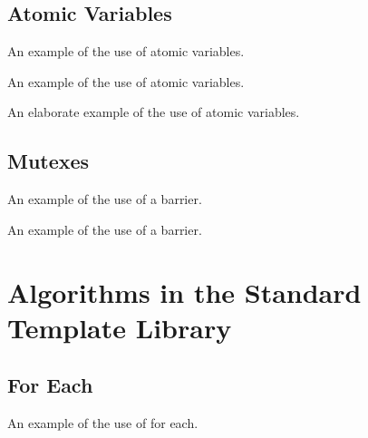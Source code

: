 \begin{itemize}
\begin{end}
\subsection{Atomic Variables}

\raggedbottom
\begin{codebox}[]{\href{https://godbolt.org/z/}{\ExternalLink}}
\footnotesize An example of the use of atomic variables.
\tcblower
{}
\end{codebox}

\raggedbottom
\begin{codebox}[]{\href{https://godbolt.org/z/}{\ExternalLink}}
\footnotesize An example of the use of atomic variables.
\tcblower
{}
\end{codebox}

\raggedbottom
\begin{codebox}[]{\href{https://godbolt.org/z/}{\ExternalLink}}
\footnotesize An elaborate example of the use of atomic variables.
\tcblower
{}
\end{codebox}

\subsection{Mutexes}

\raggedbottom
\begin{codebox}[]{\href{https://godbolt.org/z/}{\ExternalLink}}
\footnotesize An example of the use of a barrier.
\tcblower
{}
\end{codebox}

\raggedbottom
\begin{codebox}[]{\href{https://godbolt.org/z/}{\ExternalLink}}
\footnotesize An example of the use of a barrier.
\tcblower
{}
\end{codebox}

\section{Algorithms in the Standard Template Library}

\subsection{For Each}

\raggedbottom
\begin{codebox}[]{\href{https://godbolt.org/z/}{\ExternalLink}}
\footnotesize An example of the use of for each.
\tcblower
{}
\end{codebox}


\end{end}
\end{itemize}
